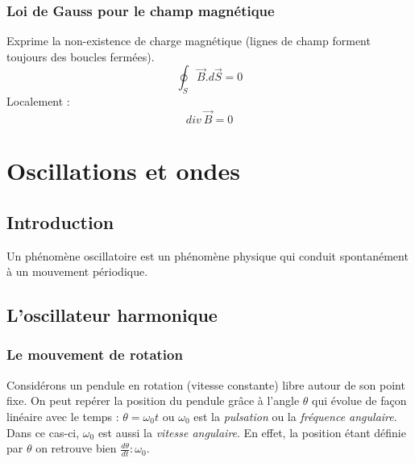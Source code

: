 \documentclass	[11pt, a4paper, openany]{book}
\begin{document}
\subsection{Loi de Gauss pour le champ magnétique}
Exprime la non-existence de charge magnétique (lignes de champ forment toujours des boucles fermées).
\begin{equation}
\oint_S \vec{B}.d\vec{S} = 0
\end{equation}
Localement :
\begin{equation}
div\ \vec{B} = 0
\end{equation}






































\chapter{Oscillations et ondes}
\section{Introduction}
Un phénomène oscillatoire est un phénomène physique qui conduit spontanément à un mouvement périodique.

\section{L'oscillateur harmonique} 
\subsection{Le mouvement de rotation}
Considérons un pendule en rotation (vitesse constante) libre autour de son point fixe. 
On peut repérer la position du pendule grâce à l'angle $\theta$ qui évolue de façon linéaire avec le temps : $\theta = \omega_0 t$ ou $\omega_0$ est la \textit{pulsation} ou la \textit{fréquence angulaire}.\\
Dans ce cas-ci, $\omega_0$ est aussi la \textit{vitesse angulaire}. En effet, la position étant définie par $\theta$ on retrouve bien $\frac{d\theta}{dt} : \omega_0$.\\
\end{document}
